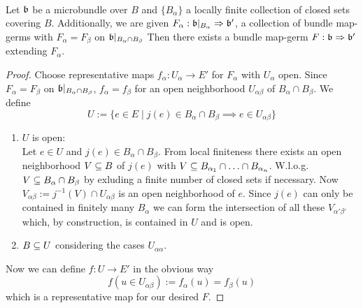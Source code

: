  \\
Let $\mathfrak{b}$ be a microbundle over $B$ and $\{B_\alpha\}$ a locally finite collection of closed sets covering $B$.
Additionally, we are given $F_\alpha: \mathfrak{b}\vert_{B_\alpha} \Rightarrow \mathfrak{b}'$, a collection of bundle map-germs with
$F_\alpha = F_\beta$ on $\mathfrak{b}\vert_{B_\alpha \cap B_\beta}$
Then there exists a bundle map-germ $F: \mathfrak{b} \Rightarrow \mathfrak{b}'$ extending $F_\alpha$.
\begin{proof}
Choose representative maps $f_\alpha: U_\alpha \to E'$ for $F_\alpha$ with $U_\alpha$ open.
Since $F_\alpha = F_\beta$ on $\mathfrak{b}\vert_{B_\alpha \cap B_\beta}$, $f_\alpha = f_\beta$ for an open neighborhood $U_{\alpha\beta}$ of $B_\alpha \cap B_\beta$.
We define
\[ U := \{ e \in E \mid j(e) \in B_\alpha \cap B_\beta \implies e \in U_{\alpha\beta} \}\]
\begin{enumerate}
    \item $U$ is open: \\
    Let $e \in U$ and $j(e) \in B_\alpha \cap B_\beta$.
    From local finiteness there exists an open neighborhood $V \subseteq B$ of $j(e)$ with $V \subseteq B_{\alpha_1} \cap \ldots \cap B_{\alpha_n}$.
    W.l.o.g. $V \subseteq B_\alpha \cap B_\beta$ by exluding a finite number of closed sets if necessary.
    Now $V_{\alpha\beta} := j^{-1}(V) \cap U_{\alpha\beta}$ is an open neighborhood of $e$.
    Since $j(e)$ can only be contained in finitely many $B_\alpha$ we can form the intersection of all these $V_{\alpha'\beta'}$
    which, by construction, is contained in $U$ and is open.
    \item $B \subseteq U$ considering the cases $U_{\alpha\alpha}$.
\end{enumerate}

Now we can define $f: U \to E'$ in the obvious way
\[ f(u \in U_{\alpha\beta}) := f_\alpha(u) = f_\beta(u) \]
which is a representative map for our desired $F$.
\end{proof}